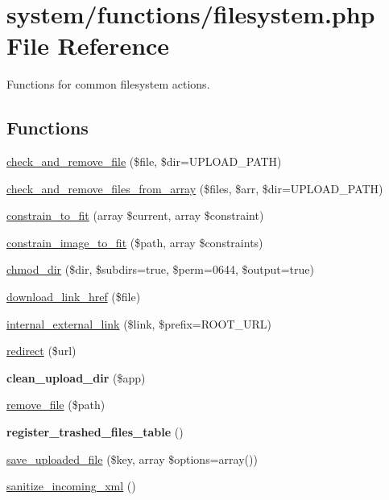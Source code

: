 \hypertarget{filesystem_8php}{
\section{system/functions/filesystem.php File Reference}
\label{filesystem_8php}
}


Functions for common filesystem actions.  


\subsection*{Functions}
\begin{DoxyCompactItemize}
\item 
\hyperlink{filesystem_8php_a0ffdf27b838ccffe2a6c3d3f9ea72233}{check\_\-and\_\-remove\_\-file} (\$file, \$dir=UPLOAD\_\-PATH)
\item 
\hyperlink{filesystem_8php_adcdbf22e1e95588f963953cf63f37aee}{check\_\-and\_\-remove\_\-files\_\-from\_\-array} (\$files, \$arr, \$dir=UPLOAD\_\-PATH)
\item 
\hyperlink{filesystem_8php_a1e2325b8103adf7f2782e46ca35f454e}{constrain\_\-to\_\-fit} (array \$current, array \$constraint)
\item 
\hyperlink{filesystem_8php_ac6bc3ce0546ea6da737ace627fe564e8}{constrain\_\-image\_\-to\_\-fit} (\$path, array \$constraints)
\item 
\hyperlink{filesystem_8php_a183ca92b18137179f3f033232f6162d5}{chmod\_\-dir} (\$dir, \$subdirs=true, \$perm=0644, \$output=true)
\item 
\hyperlink{filesystem_8php_aa55f798f1c0e792aff16e3b9a263a059}{download\_\-link\_\-href} (\$file)
\item 
\hyperlink{filesystem_8php_a04f1537a8f746fa170d0fbf8d81fbfd9}{internal\_\-external\_\-link} (\$link, \$prefix=ROOT\_\-URL)
\item 
\hyperlink{filesystem_8php_acea4248a073af4582d5069babd4656b2}{redirect} (\$url)
\item 
\hypertarget{filesystem_8php_a754ae2465f66842b68b0089648cf9d7c}{
{\bfseries clean\_\-upload\_\-dir} (\$app)}
\label{filesystem_8php_a754ae2465f66842b68b0089648cf9d7c}

\item 
\hyperlink{filesystem_8php_ac5d785c1c0bd45c268085f60ab055447}{remove\_\-file} (\$path)
\item 
\hypertarget{filesystem_8php_afaa475e1ae3f97349017a1e639170d3e}{
{\bfseries register\_\-trashed\_\-files\_\-table} ()}
\label{filesystem_8php_afaa475e1ae3f97349017a1e639170d3e}

\item 
\hyperlink{filesystem_8php_a061e6c60eddda2e65bbc5ee58d7af1c1}{save\_\-uploaded\_\-file} (\$key, array \$options=array())
\item 
\hyperlink{filesystem_8php_a82c3278468f4ae53cedbace012891a6a}{sanitize\_\-incoming\_\-xml} ()
\end{DoxyCompactItemize}


